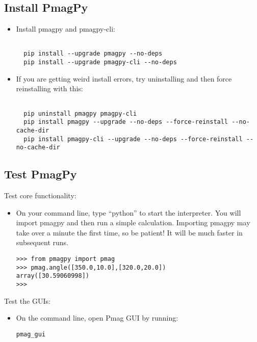 \documentclass[11pt]{article}
\begin{document}
\subsection{Install PmagPy}


\begin{itemize}
\item Install pmagpy and pmagpy-cli:

\begin{verbatim}

  pip install --upgrade pmagpy --no-deps
  pip install --upgrade pmagpy-cli --no-deps
\end{verbatim}
     \item If you are getting weird install errors, try uninstalling and then force reinstalling with this:

\begin{verbatim}

  pip uninstall pmagpy pmagpy-cli
  pip install pmagpy --upgrade --no-deps --force-reinstall --no-cache-dir
  pip install pmagpy-cli --upgrade --no-deps --force-reinstall --no-cache-dir
\end{verbatim}

   \end{itemize}

\subsection{Test PmagPy}

Test core functionality:

\begin{itemize}
  \item On your command line, type ``python'' to start the interpreter.  You will import pmagpy and then run a simple calculation.  Importing pmagpy may take over a minute the first time, so be patient!  It will be much faster in subsequent runs.

\begin{verbatim}
>>> from pmagpy import pmag
>>> pmag.angle([350.0,10.0],[320.0,20.0])
array([30.59060998])
>>>
\end{verbatim}

\end{itemize}

Test the GUIs:

\begin{itemize}
\item  On the command line, open Pmag GUI by running:

\begin{verbatim}
pmag_gui
\end{verbatim}

\end{itemize}
\end{document}
